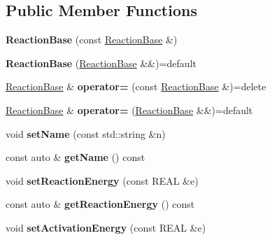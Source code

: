 \subsection*{Public Member Functions}
\begin{DoxyCompactItemize}
\item 
\mbox{\label{classReactionBase_a31c1e3e98e4735e62a1b59fb50d58189}} 
{\bfseries Reaction\+Base} (const \mbox{\hyperlink{classReactionBase}{Reaction\+Base}} \&)
\item 
\mbox{\label{classReactionBase_a68cbcd543251905a1cacd65222e758b6}} 
{\bfseries Reaction\+Base} (\mbox{\hyperlink{classReactionBase}{Reaction\+Base}} \&\&)=default
\item 
\mbox{\label{classReactionBase_a8c9f416cebd93e12b25d25f23369bc4d}} 
\mbox{\hyperlink{classReactionBase}{Reaction\+Base}} \& {\bfseries operator=} (const \mbox{\hyperlink{classReactionBase}{Reaction\+Base}} \&)=delete
\item 
\mbox{\label{classReactionBase_ac82aa6be6c875ef2e0814bc80b37e89e}} 
\mbox{\hyperlink{classReactionBase}{Reaction\+Base}} \& {\bfseries operator=} (\mbox{\hyperlink{classReactionBase}{Reaction\+Base}} \&\&)=default
\item 
\mbox{\label{classReactionBase_ac8a3d47ec48f88eb9cabdb419d494840}} 
void {\bfseries set\+Name} (const std\+::string \&n)
\item 
\mbox{\label{classReactionBase_ae14a20704f5ffa9f97b0e218267fcfde}} 
const auto \& {\bfseries get\+Name} () const
\item 
\mbox{\label{classReactionBase_abb467dc64b5eae8719fb32197f33ccda}} 
void {\bfseries set\+Reaction\+Energy} (const R\+E\+AL \&e)
\item 
\mbox{\label{classReactionBase_a36387f94f86afc9aa09e0803b1bdff77}} 
const auto \& {\bfseries get\+Reaction\+Energy} () const
\item 
\mbox{\label{classReactionBase_a320d3cc723874f2274cda66f1d06aea0}} 
void {\bfseries set\+Activation\+Energy} (const R\+E\+AL \&e)

\end{DoxyCompactItemize}
